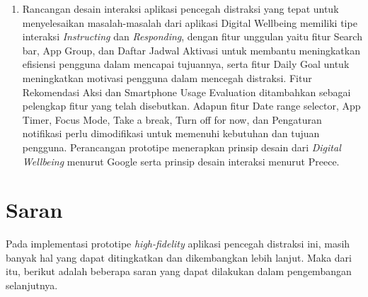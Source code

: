 \begin{enumerate}
\begin{enumerate}[label=\alph*.]
    \end{enumerate}
    
  \item Rancangan desain interaksi aplikasi pencegah distraksi yang tepat untuk menyelesaikan masalah-masalah dari aplikasi Digital Wellbeing memiliki tipe interaksi \textit{Instructing} dan \textit{Responding}, dengan fitur unggulan yaitu fitur Search bar, App Group, dan Daftar Jadwal Aktivasi untuk membantu meningkatkan efisiensi pengguna dalam mencapai tujuannya, serta fitur Daily Goal untuk meningkatkan motivasi pengguna dalam mencegah distraksi. Fitur Rekomendasi Aksi dan Smartphone Usage Evaluation ditambahkan sebagai pelengkap fitur yang telah disebutkan. Adapun fitur Date range selector, App Timer, Focus Mode, Take a break, Turn off for now, dan Pengaturan notifikasi perlu dimodifikasi untuk memenuhi kebutuhan dan tujuan pengguna. Perancangan prototipe menerapkan prinsip desain dari \textit{Digital Wellbeing} menurut Google serta prinsip desain interaksi menurut Preece.  
   
\end{enumerate}

\section{Saran}
Pada implementasi prototipe \textit{high-fidelity} aplikasi pencegah distraksi ini, masih banyak hal yang dapat ditingkatkan dan dikembangkan lebih lanjut. Maka dari itu, berikut adalah beberapa saran yang dapat dilakukan dalam pengembangan selanjutnya.

